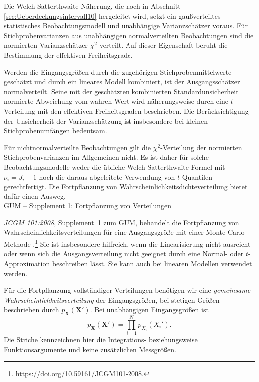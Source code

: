 Die Welch-Satterthwaite-Näherung, die noch in Abschnitt \ref{sec:Ueberdeckungsintervall10} hergeleitet wird, setzt ein
gaußverteiltes statistisches Beobachtungsmodell und unabhängige
Varianzschätzer voraus. Für Stichprobenvarianzen aus unabhängigen
normalverteilten Beobachtungen sind die normierten Varianzschätzer
$\chi^2$-verteilt. Auf dieser Eigenschaft beruht die Bestimmung
der effektiven Freiheitsgrade.

Werden die Eingangsgrößen durch die zugehörigen Stichprobenmittelwerte
geschätzt und durch ein lineares Modell kombiniert, ist der
Ausgangsschätzer normalverteilt. Seine mit der geschätzten kombinierten
Standardunsicherheit normierte Abweichung vom wahren Wert wird
näherungsweise durch eine $t$-Verteilung mit den effektiven
Freiheitsgraden beschrieben. Die Berücksichtigung der Unsicherheit
der Varianzschätzung ist insbesondere bei kleinen Stichprobenumfängen
bedeutsam.

Für nichtnormalverteilte Beobachtungen gilt die
$\chi^2$-Verteilung der normierten Stichprobenvarianzen im Allgemeinen
nicht. Es ist daher für solche Beobachtungsmodelle weder die übliche
Welch-Satterthwaite-Formel mit $\nu_i=J_i-1$ noch die daraus
abgeleitete Verwendung von $t$-Quantilen gerechtfertigt. Die Fortpflanzung von Wahrscheinlichkeitsdichteverteilung bietet dafür einen Ausweg.\\

\underline{GUM -- Supplement 1: Fortpflanzung von Verteilungen}

\textsl{JCGM 101:2008}, Supplement~1 zum GUM, behandelt die Fortpflanzung von
Wahrscheinlichkeitsverteilungen für eine Ausgangsgröße mit einer
Monte-Carlo-Methode \cite{GUMS1}.\footnote{\url{https://doi.org/10.59161/JCGM101-2008}.}
Sie ist insbesondere hilfreich, wenn die Linearisierung nicht ausreicht oder
wenn sich die Ausgangsverteilung nicht geeignet durch eine Normal- oder
$t$-Approximation beschreiben lässt. Sie kann auch bei linearen Modellen
verwendet werden.

Für die Fortpflanzung vollständiger Verteilungen benötigen wir eine
\textsl{gemeinsame Wahrscheinlichkeitsverteilung} der Eingangsgrößen, bei
stetigen Größen beschrieben durch $p_{\mathbf X}(\mathbf X')$.
Bei unabhängigen Eingangsgrößen ist
\begin{equation}
p_{\mathbf X}(\mathbf X')=\prod_{i=1}^N p_{X_i}(X_i').
\end{equation}
Die Striche kennzeichnen hier die Integrations- beziehungsweise
Funktionsargumente und keine zusätzlichen Messgrößen.

